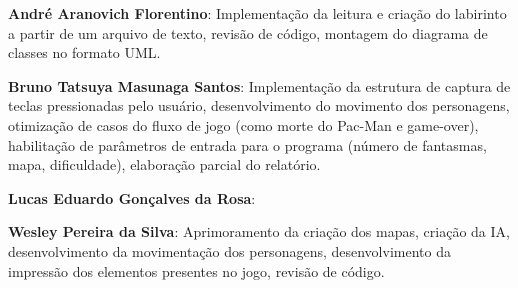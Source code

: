 \documentclass[]{article}
\begin{document}
\textbf{André Aranovich Florentino}: Implementação da leitura e criação do labirinto a partir de um arquivo de texto, revisão de código, montagem do diagrama de classes no formato UML.

\textbf{Bruno Tatsuya Masunaga Santos}: Implementação da estrutura de captura de teclas pressionadas pelo usuário, desenvolvimento do movimento dos personagens, otimização de casos do fluxo de jogo (como morte do Pac-Man e game-over), habilitação de parâmetros de entrada para o programa (número de fantasmas, mapa, dificuldade), elaboração parcial do relatório.

\textbf{Lucas Eduardo Gonçalves da Rosa}: 

\textbf{Wesley Pereira da Silva}: Aprimoramento da criação dos mapas, criação da IA, desenvolvimento da movimentação dos personagens, desenvolvimento da impressão dos elementos presentes no jogo, revisão de código.
\end{document}
